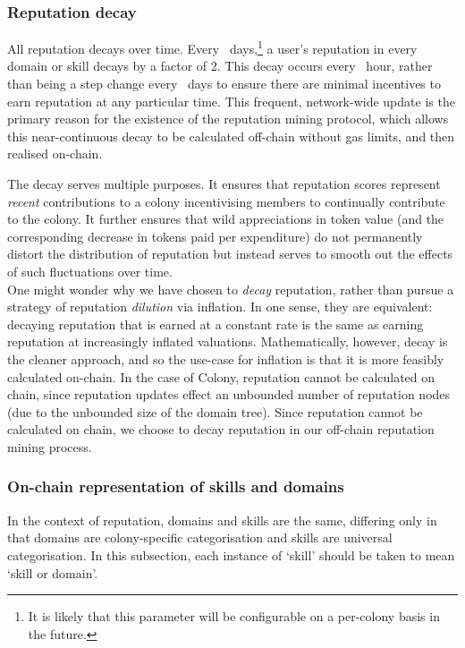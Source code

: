 \subsubsection*{Reputation decay}

All reputation decays over time. Every \repdecayduration\ days,\footnote{It is likely that this parameter will be configurable on a per-colony basis in the future.} a user's reputation in every domain or skill decays by a factor of 2. This decay occurs every \miningcycleduration\ hour, rather than being a step change every \repdecayduration\ days to ensure there are minimal incentives to earn reputation at any particular time. This frequent, network-wide update is the primary reason for the existence of the reputation mining protocol, which allows this near-continuous decay to be calculated off-chain without gas limits, and then realised on-chain.

The decay serves multiple purposes. It ensures that reputation scores represent \emph{recent} contributions to a colony incentivising members to continually contribute to the colony. It further ensures that wild appreciations in token value (and the corresponding decrease in tokens paid per expenditure) do not permanently distort the distribution of reputation but instead serves to smooth out the effects of such fluctuations over time. \\

One might wonder why we have chosen to \textit{decay} reputation, rather than pursue a strategy of reputation \textit{dilution} via inflation. In one sense, they are equivalent: decaying reputation that is earned at a constant rate is the same as earning reputation at increasingly inflated valuations. Mathematically, however, decay is the cleaner approach, and so the use-case for inflation is that it is more feasibly calculated on-chain. In the case of Colony, reputation cannot be calculated on chain, since reputation updates effect an unbounded number of reputation nodes (due to the unbounded size of the domain tree). Since reputation cannot be calculated on chain, we choose to decay reputation in our off-chain reputation mining process.

\subsubsection{On-chain representation of skills and domains}\label{subsec:on-chain-representation-of-skills}

In the context of reputation, domains and skills are the same, differing only in that domains are colony-specific categorisation and skills are universal categorisation. In this subsection, each instance of `skill' should be taken to mean `skill or domain'.

